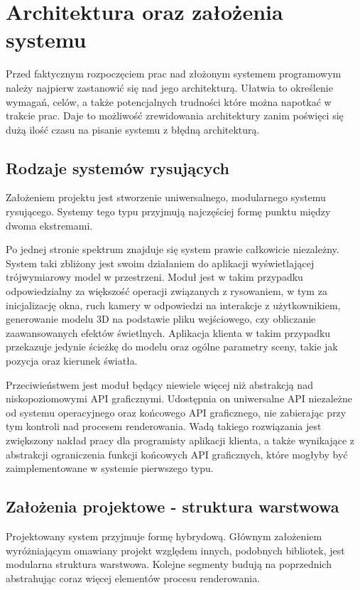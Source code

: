 \chapter{Architektura oraz założenia systemu}
Przed faktycznym rozpoczęciem prac nad złożonym systemem programowym należy najpierw zastanowić się nad jego architekturą.
Ułatwia to określenie wymagań, celów, a także potencjalnych trudności które można napotkać w trakcie prac. 
Daje to możliwość zrewidowania architektury zanim poświęci się dużą ilość czasu na pisanie systemu z błędną architekturą.

\section{Rodzaje systemów rysujących}
Założeniem projektu jest stworzenie uniwersalnego, modularnego systemu rysującego.
Systemy tego typu przyjmują najczęściej formę punktu między dwoma ekstremami. 

Po jednej stronie spektrum znajduje się system prawie całkowicie niezależny. 
System taki zbliżony jest swoim działaniem do aplikacji wyświetlającej trójwymiarowy model w przestrzeni.
Moduł jest w takim przypadku odpowiedzialny za większość operacji związanych z rysowaniem, 
    w tym za inicjalizację okna, ruch kamery w odpowiedzi na interakcje z użytkownikiem,
    generowanie modelu 3D na podstawie pliku wejściowego, czy obliczanie zaawansowanych efektów świetlnych.
Aplikacja klienta w takim przypadku przekazuje jedynie ścieżkę do modelu oraz ogólne parametry sceny, takie jak pozycja oraz kierunek światła.

Przeciwieństwem jest moduł będący niewiele więcej niż abstrakcją nad niskopoziomowymi API graficznymi.
Udostępnia on uniwersalne API niezależne od systemu operacyjnego oraz końcowego API graficznego,
    nie zabierając przy tym kontroli nad procesem renderowania.
Wadą takiego rozwiązania jest zwiększony nakład pracy dla programisty aplikacji klienta,
    a także wynikające z abstrakcji ograniczenia funkcji końcowych API graficznych, które mogłyby być zaimplementowane w systemie pierwszego typu.

\section{Założenia projektowe - struktura warstwowa}
Projektowany system przyjmuje formę hybrydową.
Głównym założeniem wyróżniającym omawiany projekt względem innych, podobnych bibliotek, jest modularna struktura warstwowa.
Kolejne segmenty budują na poprzednich abstrahując coraz więcej elementów procesu renderowania.

